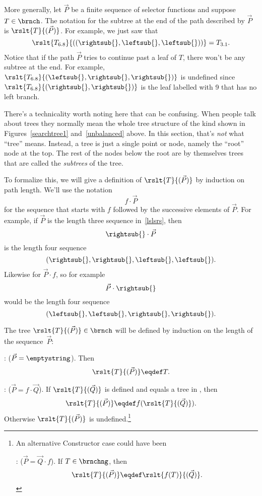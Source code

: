 \begin{definition}
More generally, let $\vec{P}$ be a finite sequence of selector
functions and suppose $T \in \brnch$.  The notation for the subtree at
the end of the path described by $\vec{P}$ is $\rslt{T}{(\vec{P})}$.
For example, we just saw that
\[
\rslt{T_{6.8}}{((\rightsub{},\leftsub{},\leftsub{}))} = T_{3.1}.
\]
Notice that if the path $\vec{P}$ tries to continue past a leaf of
$T$, there won't be any subtree at the end.  For example,
$\rslt{T_{6.8}}{(\leftsub{},\rightsub{},\rightsub{})}$ is undefined
since $\rslt{T_{6.8}}{(\rightsub{},\rightsub{})}$ is the leaf labelled
with 9 that has no left branch.

There's a technicality worth noting here that can be confusing.  When
people talk about trees they normally mean the whole tree structure of
the kind shown in Figures~\ref{searchtree1} and~\ref{unbalanced}
above.  In this section, that's \emph{not} what ``tree'' means.  Instead, a
tree is just a single point or node, namely the ``root'' node at the
top.  The rest of the nodes below the root are by themselves trees
that are called the \emph{subtrees} of the tree.

To formalize this, we will give a definition of $\rslt{T}{(\vec{P})}$
by induction on path length.  We'll use the notation
\[
f \cdot \vec{P}
\]
for the sequence that starts with $f$ followed by the successive
elements of $\vec{P}$.  For example, if $\vec{P}$ is the length three
sequence in~\eqref{lslsrs}, then
\[
\rightsub{} \cdot \vec{P}
\]
is the length four sequence
\[
(\rightsub{},\rightsub{}, \leftsub{},\leftsub{}).
\]
Likewise for $\vec{P} \cdot f$, so for example
\[
 \vec{P} \cdot \rightsub{}
\]
would be the length four sequence
\[
(\leftsub{},\leftsub{},\rightsub{},\rightsub{}).
\]

\begin{definition}
The tree $\rslt{T}{(\vec{P})} \in \brnch$ will be defined by induction
on the length of the sequence~$\vec{P}$:

: ($\vec{P} = \emptystring$).
Then
\[
\rslt{T}{(\vec{P})} \eqdef T.
\]

: ($\vec{P} = f \cdot \vec{Q}$).  If
$\rslt{T}{(\vec{Q})}$ is defined and equals a tree in \brnchng, then
\[
\rslt{T}{(\vec{P})} \eqdef f(\rslt{T}{(\vec{Q})}).
\]
Otherwise $\rslt{T}{(\vec{P})}$ is undefined.\footnote{An alternative
  Constructor case could have been

: ($\vec{P} = \vec{Q} \cdot f$).  If
$T \in \brnchng$, then
\[
\rslt{T}{(\vec{P})} \eqdef \rslt{f(T)}{(\vec{Q})}.
\]}


\end{definition}
\end{definition}

